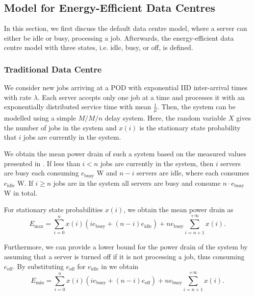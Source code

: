 \subsection{Model for Energy-Efficient Data Centres}\label{sec:cloud:data_centers:modeling}
In this section, we first discuss the default data centre model, where a server can either be idle or busy, processing a job. Afterwards, the energy-efficient data centre model with three states, i.e. idle, busy, or off, is defined.

\subsubsection*{Traditional Data Centre}\label{sec:cloud:data_centers:modeling:default}
We consider new jobs arriving at a \gls{POD} with exponential \gls{IID} inter-arrival times with rate \(\lambda\).
Each server accepts only one job at a time and processes it with an exponentially distributed service time with mean \(\frac{1}{\mu}\).
Then, the system can be modelled using a simple \(M/M/n\) delay system.
Here, the random variable \(X\) gives the number of jobs in the system and \(x(i)\) is the stationary state probability that \(i\) jobs are currently in the system.

We obtain the mean power drain of such a system based on the measured values presented in .
If less than \(i < n\) jobs are currently in the system, then \(i\) servers are busy each consuming \(e_\text{busy}\) \si{\watt} and \(n-i\) servers are idle, where each consumes \(e_\text{idle}\) \si{\watt}.
If \(i \geq n\) jobs are in the system all servers are busy and consume \(n\cdot e_\text{busy}\) \si{\watt} in total.

For stationary state probabilities \(x(i)\), we obtain the mean power drain as
\begin{equation}\label{sec:cloud:data_centers:modeling:default:emax}
E_\text{max} = \sum_{i=0}^{n} x(i) (i e_\text{busy} + (n-i) e_\text{idle}) + ne_\text{busy} \sum_{i=n + 1}^{+ \infty} x(i).
\end{equation}

Furthermore, we can provide a lower bound for the power drain of the system by assuming that a server is turned off if it is not processing a job, thus consuming \(e_\text{off}\).
By substituting \(e_\text{off}\) for \(e_\text{idle}\) in  we obtain
\begin{equation*}
E_\text{min} = \sum_{i=0}^{n} x(i) (i e_\text{busy} + (n-i) e_\text{off}) + ne_\text{busy} \sum_{i=n + 1}^{+ \infty} x(i).
\end{equation*}

